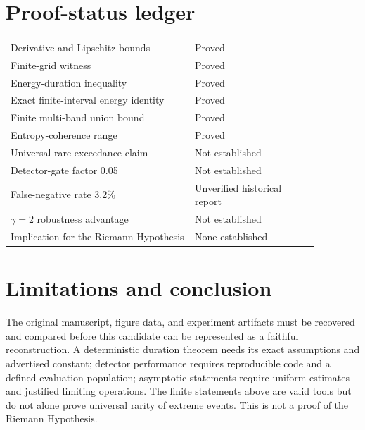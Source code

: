 \documentclass[11pt]{article}
\theoremstyle{definition}\newtheorem{definition}[theorem]{Definition}
\theoremstyle{remark}\newtheorem{remark}[theorem]{Remark}
\begin{document}
\section{Proof-status ledger}
\begin{center}\begin{tabular}{p{0.52\linewidth}p{0.35\linewidth}}\toprule
Derivative and Lipschitz bounds & Proved\\
Finite-grid witness & Proved\\
Energy-duration inequality & Proved\\
Exact finite-interval energy identity & Proved\\
Finite multi-band union bound & Proved\\
Entropy-coherence range & Proved\\
Universal rare-exceedance claim & Not established\\
Detector-gate factor 0.05 & Not established\\
False-negative rate 3.2\% & Unverified historical report\\
$\gamma=2$ robustness advantage & Not established\\
Implication for the Riemann Hypothesis & None established\\\bottomrule\end{tabular}\end{center}
\section{Limitations and conclusion}
The original manuscript, figure data, and experiment artifacts must be recovered and compared before this candidate can be represented as a faithful reconstruction. A deterministic duration theorem needs its exact assumptions and advertised constant; detector performance requires reproducible code and a defined evaluation population; asymptotic statements require uniform estimates and justified limiting operations. The finite statements above are valid tools but do not alone prove universal rarity of extreme events. This is not a proof of the Riemann Hypothesis.
\end{document}
